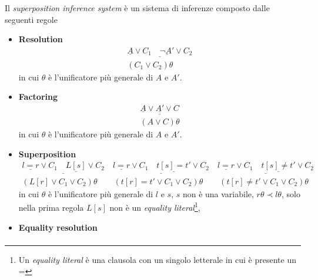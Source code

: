 \begin{definition}
    Il \emph{superposition inference system} è un sistema di inferenze composto dalle seguenti regole
    \begin{itemize}
        \item \textbf{Resolution}
        \begin{equation}
            \begin{gathered}
                \underline{\underline{A} \lor C_1 \quad\underline{\lnot A'}\lor C_2}\\
                (C_1 \lor C_2)\theta
            \end{gathered}
        \end{equation}
        in cui $\theta$ è l'unificatore più generale di $A$ e $A'$.
        \item \textbf{Factoring}
        \begin{equation}
            \begin{gathered}
                \underline{\underline{A} \lor \underline{A'} \lor C}\\
                (A \lor C)\theta
            \end{gathered}
        \end{equation}
        in cui $\theta$ è l'unificatore più generale di $A$ e $A'$.
        \item \textbf{Superposition}
        \begin{equation}
            \begin{gathered}
                \underline{\underline{l=r} \lor C_1 \quad \underline{L[s]}\lor C_2} \quad \underline{\underline{l=r} \lor C_1 \quad \underline{t[s]=t'}\lor C_2} \quad \underline{\underline{l=r} \lor C_1 \quad \underline{t[s]\neq t'}\lor C_2}\\
                (L[r] \lor C_1 \lor C_2)\theta \qquad (t[r]=t' \lor C_1 \lor C_2)\theta \qquad (t[r]\neq t' \lor C_1 \lor C_2)\theta
            \end{gathered}
        \end{equation}
        in cui $\theta$ è l'unificatore più generale di $l$ e $s$, $s$ non è una variabile, 
        $r\theta\prec l\theta$, solo nella prima regola $L[s]$ non è un \emph{equality literal}\footnote{Un \emph{equality literal} è una clausola 
        con un singolo letterale in cui è presente un =},
        \item \textbf{Equality resolution}
        \begin{equation}
            \begin{gathered}

\end{gathered}
\end{equation}
\end{itemize}
\end{definition}
